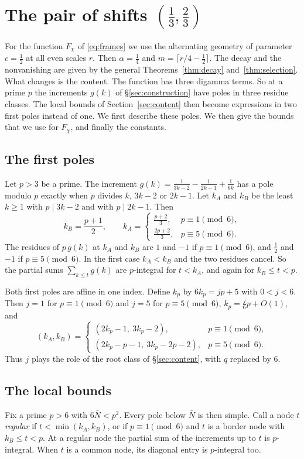\section{The pair of shifts \texorpdfstring{$(\frac13,\frac23)$}{(1/3,2/3)}}
\label{sec:chi3-quarter}

For the function $F_\chi$ of \eqref{eq:frames} we use the alternating geometry of parameter $c=\frac12$ at all even scales
$r$. Then $\alpha=\frac14$ and $m=\lceil r/4-\frac12\rceil$. The decay and the nonvanishing are given by the general
Theorems~\ref{thm:decay} and~\ref{thm:selection}. What changes is the content. The function has three digamma terms. So at a
prime $p$ the increments $g(k)$ of \S\ref{sec:construction} have poles in three residue classes. The local bounds of
Section~\ref{sec:content} then become expressions in two first poles instead of one. We first describe these poles. We
then give the bounds that we use for $F_\chi$, and finally the constants.

\subsection{The first poles}
Let $p>3$ be a prime. The increment $g(k)=\frac1{3k-2}-\frac1{2k-1}+\frac1{6k}$ has a pole modulo $p$ exactly when $p$
divides $k$, $3k-2$ or $2k-1$. Let $k_A$ and $k_B$ be the least $k\ge1$ with $p\mid3k-2$ and with $p\mid2k-1$. Then
\[
 k_B=\frac{p+1}2,\qquad
 k_A=\begin{cases}\frac{p+2}3,&p\equiv1\pmod6,\\[3pt]\frac{2p+2}3,&p\equiv5\pmod6.\end{cases}
\]
The residues of $p\,g(k)$ at $k_A$ and $k_B$ are $1$ and $-1$ if $p\equiv1\pmod6$, and $\frac12$ and $-1$ if
$p\equiv5\pmod6$. In the first case $k_A<k_B$ and the two residues cancel. So the partial sums $\sum_{k\le t}g(k)$ are
$p$-integral for $t<k_A$, and again for $k_B\le t<p$.

Both first poles are affine in one index. Define $k_p$ by $6k_p=jp+5$ with $0<j<6$. Then $j=1$ for $p\equiv1\pmod6$ and
$j=5$ for $p\equiv5\pmod6$, $k_p=\frac j6p+O(1)$, and
\[
 (k_A,k_B)=\begin{cases}(2k_p-1,\ 3k_p-2),&p\equiv1\pmod6,\\[2pt](2k_p-p-1,\ 3k_p-2p-2),&p\equiv5\pmod6.\end{cases}
\]
Thus $j$ plays the role of the root class of \S\ref{sec:content}, with $q$ replaced by $6$.

\subsection{The local bounds}
Fix a prime $p>6$ with $6\bar N<p^2$. Every pole below $\bar N$ is then simple. Call a node $t$ \emph{regular} if
$t<\min(k_A,k_B)$, or if $p\equiv1\pmod6$ and $t$ is a border node with $k_B\le t<p$. At a regular node the partial sum
of the increments up to $t$ is $p$-integral. When $t$ is a common node, its diagonal entry is $p$-integral too.

